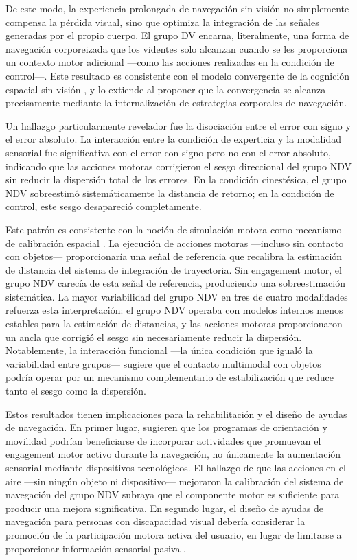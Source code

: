 \documentclass[12pt,letterpaper]{article}
\begin{document}
De este modo, la experiencia prolongada de navegación sin visión no simplemente compensa la pérdida visual, sino que optimiza la integración de las señales generadas por el propio cuerpo. El grupo DV encarna, literalmente, una forma de navegación corporeizada que los videntes solo alcanzan cuando se les proporciona un contexto motor adicional ---como las acciones realizadas en la condición de control---. Este resultado es consistente con el modelo convergente de la cognición espacial sin visión \parencite{Giudice2018}, y lo extiende al proponer que la convergencia se alcanza precisamente mediante la internalización de estrategias corporales de navegación.

Un hallazgo particularmente revelador fue la disociación entre el error con signo y el error absoluto. La interacción entre la condición de experticia y la modalidad sensorial fue significativa con el error con signo pero no con el error absoluto, indicando que las acciones motoras corrigieron el sesgo direccional del grupo NDV sin reducir la dispersión total de los errores. En la condición cinestésica, el grupo NDV sobreestimó sistemáticamente la distancia de retorno; en la condición de control, este sesgo desapareció completamente.

Este patrón es consistente con la noción de simulación motora como mecanismo de calibración espacial \parencite{Jeannerod2001}. La ejecución de acciones motoras ---incluso sin contacto con objetos--- proporcionaría una señal de referencia que recalibra la estimación de distancia del sistema de integración de trayectoria. Sin engagement motor, el grupo NDV carecía de esta señal de referencia, produciendo una sobreestimación sistemática. La mayor variabilidad del grupo NDV en tres de cuatro modalidades refuerza esta interpretación: el grupo NDV operaba con modelos internos menos estables para la estimación de distancias, y las acciones motoras proporcionaron un ancla que corrigió el sesgo sin necesariamente reducir la dispersión. Notablemente, la interacción funcional ---la única condición que igualó la variabilidad entre grupos--- sugiere que el contacto multimodal con objetos podría operar por un mecanismo complementario de estabilización que reduce tanto el sesgo como la dispersión.

Estos resultados tienen implicaciones para la rehabilitación y el diseño de ayudas de navegación. En primer lugar, sugieren que los programas de orientación y movilidad podrían beneficiarse de incorporar actividades que promuevan el engagement motor activo durante la navegación, no únicamente la aumentación sensorial mediante dispositivos tecnológicos. El hallazgo de que las acciones en el aire ---sin ningún objeto ni dispositivo--- mejoraron la calibración del sistema de navegación del grupo NDV subraya que el componente motor es suficiente para producir una mejora significativa. En segundo lugar, el diseño de ayudas de navegación para personas con discapacidad visual debería considerar la promoción de la participación motora activa del usuario, en lugar de limitarse a proporcionar información sensorial pasiva \parencite{Quinn2024}.
\end{document}
